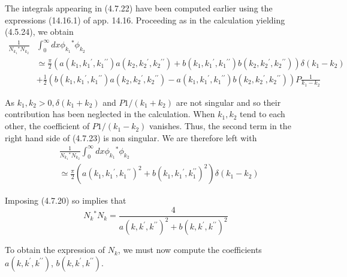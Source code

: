 \documentclass{article}
\begin{document}
The integrals appearing in (4.7.22) have been computed earlier using the expressions (14.16.1) of app. 14.16. Proceeding as in the calculation yielding (4.5.24), we obtain
$$
\begin{align*}
\frac{1}{N_{k_{1}}{ }^{*} N_{k_{2}}} & \int_{0}^{\infty} d x \phi_{k_{1}}{ }^{*} \phi_{k_{2}}  \tag{4.7.23}\\
& \simeq \frac{\pi}{2}\left(a\left(k_{1}, k_{1}{ }^{\prime}, k_{1}{ }^{\prime \prime}\right) a\left(k_{2}, k_{2}{ }^{\prime}, k_{2}{ }^{\prime \prime}\right)+b\left(k_{1}, k_{1}{ }^{\prime}, k_{1}{ }^{\prime \prime}\right) b\left(k_{2}, k_{2}{ }^{\prime}, k_{2}{ }^{\prime \prime}\right)\right) \delta\left(k_{1}-k_{2}\right) \\
& +\frac{1}{2}\left(b\left(k_{1}, k_{1}{ }^{\prime}, k_{1}{ }^{\prime \prime}\right) a\left(k_{2}, k_{2}{ }^{\prime}, k_{2}{ }^{\prime \prime}\right)-a\left(k_{1}, k_{1}{ }^{\prime}, k_{1}{ }^{\prime \prime}\right) b\left(k_{2}, k_{2}{ }^{\prime}, k_{2}{ }^{\prime \prime}\right)\right) P \frac{1}{k_{1}-k_{2}}
\end{align*}
$$

As $k_{1}, k_{2}>0, \delta\left(k_{1}+k_{2}\right)$ and $P 1 /\left(k_{1}+k_{2}\right)$ are not singular and so their contribution has been neglected in the calculation. When $k_{1}, k_{2}$ tend to each other, the coefficient of $P 1 /\left(k_{1}-k_{2}\right)$ vanishes. Thus, the second term in the right hand side of (4.7.23) is non singular. We are therefore left with
$$
\begin{align*}
& \frac{1}{N_{k_{1}}{ }^{*} N_{k_{2}}} \int_{0}^{\infty} d x \phi_{k_{1}}{ }^{*} \phi_{k_{2}}  \tag{4.7.24}\\
& \simeq \frac{\pi}{2}\left(a\left(k_{1}, k_{1}{ }^{\prime}, k_{1}{ }^{\prime \prime}\right)^{2}+b\left(k_{1}, k_{1}{ }^{\prime}, k_{1}^{\prime \prime}\right)^{2}\right) \delta\left(k_{1}-k_{2}\right)
\end{align*}
$$

Imposing (4.7.20) so implies that
$$
\begin{equation*}
N_{k}{ }^{*} N_{k}=\frac{4}{a\left(k, k^{\prime}, k^{\prime \prime}\right)^{2}+b\left(k, k^{\prime}, k^{\prime \prime}\right)^{2}} \tag{4.7.25}
\end{equation*}
$$

To obtain the expression of $N_{k}$, we must now compute the coefficients $a\left(k, k^{\prime}, k^{\prime \prime}\right)$, $b\left(k, k^{\prime}, k^{\prime \prime}\right)$.
\end{document}

